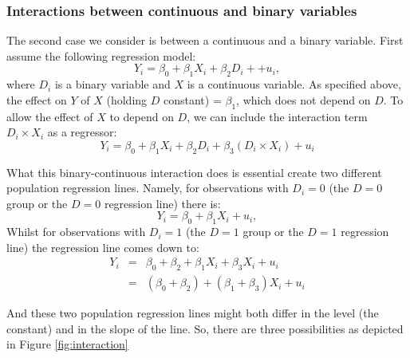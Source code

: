 \documentclass[
]{book}
\begin{document}
\hypertarget{interactions-between-continuous-and-binary-variables}{%
\subsubsection{Interactions between continuous and binary variables}\label{interactions-between-continuous-and-binary-variables}}

The second case we consider is between a continuous and a binary variable. First assume the following regression model:
\begin{equation}
Y_i =\beta_0 + \beta_1 X_i + \beta_2 D_i + +u_i, 
\end{equation}
where \(D_i\) is a binary variable and \(X\) is a continuous variable. As specified above, the effect on \(Y\) of \(X\) (holding \(D\) constant) = \(\beta_1\), which does not depend on \(D\). To allow the effect of \(X\) to depend on \(D\), we can include the interaction term \(D_i \times X_i\) as a regressor:
\begin{equation}
Y_i =\beta_0 + \beta_1 X_i + \beta_2 D_i  + \beta_3 (D_i \times X_i) + u_i
\end{equation}

What this binary-continuous interaction does is essential create two different population regression lines. Namely, for observations with \(D_i= 0\) (the \(D = 0\) group or the \(D=0\) regression line) there is:
\begin{equation}
Y_i = \beta_0 + \beta_1 X_i  + u_i,
\end{equation}
Whilst for observations with \(D_i= 1\) (the \(D = 1\) group or the \(D = 1\) regression line) the regression line comes down to:
\begin{eqnarray}
Y_i &=&   \beta_0 + \beta_2 + \beta_1 X_i + \beta_3 X_i + u_i \\
            &=&  (\beta_0 + \beta_2) + (\beta_1 + \beta_3) X_i + u_i
\end{eqnarray}

And these two population regression lines might both differ in the level (the constant) and in the slope of the line. So, there are three possibilities as depicted in Figure \ref{fig:interaction}
\end{document}
